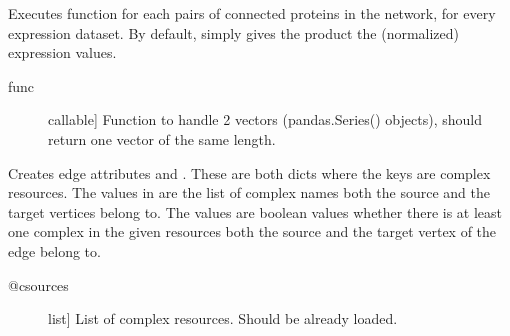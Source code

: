 \documentclass[letterpaper,10pt,english]{sphinxmanual}
\begin{document}
\begin{fulllineitems}
\begin{fulllineitems}
\begin{quote}
\begin{description}
\begin{itemize}
\end{itemize}

\end{description}\end{quote}

\end{fulllineitems}


\begin{fulllineitems}
\label{\detokenize{reference:pypath.main.PyPath.edges_expression}}
Executes function  for each pairs of connected proteins in the
network, for every expression dataset. By default,  simply
gives the product the (normalized) expression values.
\begin{description}
\item[{func}] \leavevmode{[}callable{]}
Function to handle 2 vectors (pandas.Series() objects), should
return one vector of the same length.

\end{description}

\end{fulllineitems}


\begin{fulllineitems}
\label{\detokenize{reference:pypath.main.PyPath.edges_in_comlexes}}
Creates edge attributes  and .
These are both dicts where the keys are complex resources.
The values in  are the list of complex names
both the source and the target vertices belong to.
The values  are boolean values whether there
is at least one complex in the given resources both the
source and the target vertex of the edge belong to.
\begin{description}
\item[{@csources}] \leavevmode{[}list{]}
List of complex resources. Should be already loaded.


\end{description}
\end{fulllineitems}
\end{fulllineitems}
\end{document}

